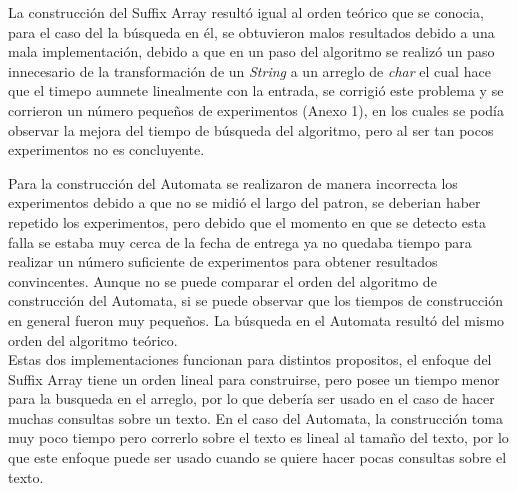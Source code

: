 \documentclass[letterpaper,10pt]{article}
\begin{document}
	La construcción del Suffix Array resultó igual al orden teórico que se conocia, para el caso del la búsqueda en él, se obtuvieron malos resultados debido a una mala implementación, debido a que en un paso del algoritmo se realizó un paso innecesario de la transformación de un \textit{String} a un arreglo de \textit{char} el cual hace que el timepo aumnete linealmente con la entrada, se corrigió este problema y se corrieron un número pequeños de experimentos (Anexo 1), en los cuales se podía observar la mejora del tiempo de búsqueda del algoritmo, pero al ser tan pocos experimentos no es concluyente.
	
	Para la construcción del Automata se realizaron de manera incorrecta los experimentos debido a que no se midió el largo del patron, se deberian haber repetido los experimentos, pero debido que el momento en que se detecto esta falla se estaba muy cerca de la fecha de entrega ya no quedaba tiempo para realizar un número suficiente de experimentos para obtener resultados convincentes. Aunque no se puede comparar el orden del algoritmo de construcción del Automata, si se puede observar que los tiempos de construcción en general fueron muy pequeños. La búsqueda en el Automata resultó del mismo orden del algoritmo teórico.\\
	
	Estas dos implementaciones funcionan para distintos propositos, el enfoque del Suffix Array tiene un orden lineal para construirse, pero posee un tiempo menor para la busqueda en el arreglo, por lo que debería ser usado en el caso de hacer muchas consultas sobre un texto. En el caso del Automata, la construcción toma muy poco tiempo pero correrlo sobre el texto es lineal al tamaño del texto, por lo que este enfoque puede ser usado cuando se quiere hacer pocas consultas sobre el texto.
	
       
	
	
	
	
\end{document}
